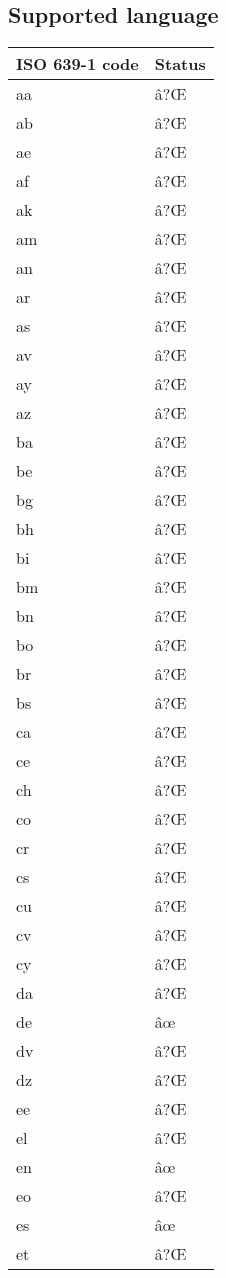 \subsection{Supported language}\label{supported-language}

\begin{longtable}[]{@{}ll@{}}
\toprule\noalign{}
ISO 639-1 code & Status \\
\midrule\noalign{}
\endhead
\bottomrule\noalign{}
\endlastfoot
aa & â?Œ \\
ab & â?Œ \\
ae & â?Œ \\
af & â?Œ \\
ak & â?Œ \\
am & â?Œ \\
an & â?Œ \\
ar & â?Œ \\
as & â?Œ \\
av & â?Œ \\
ay & â?Œ \\
az & â?Œ \\
ba & â?Œ \\
be & â?Œ \\
bg & â?Œ \\
bh & â?Œ \\
bi & â?Œ \\
bm & â?Œ \\
bn & â?Œ \\
bo & â?Œ \\
br & â?Œ \\
bs & â?Œ \\
ca & â?Œ \\
ce & â?Œ \\
ch & â?Œ \\
co & â?Œ \\
cr & â?Œ \\
cs & â?Œ \\
cu & â?Œ \\
cv & â?Œ \\
cy & â?Œ \\
da & â?Œ \\
de & âœ \\
dv & â?Œ \\
dz & â?Œ \\
ee & â?Œ \\
el & â?Œ \\
en & âœ \\
eo & â?Œ \\
es & âœ \\
et & â?Œ \\

\end{longtable}
